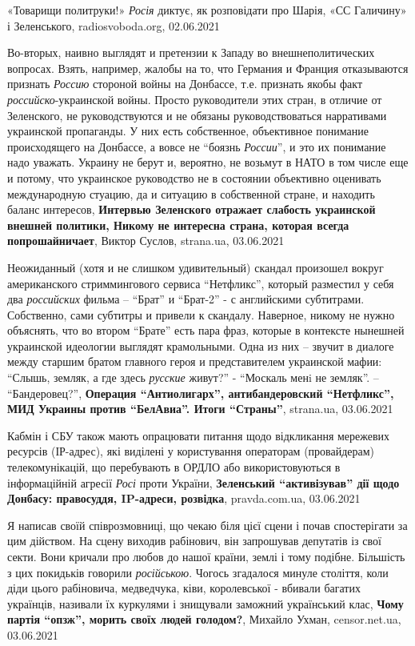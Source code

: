 «Товарищи политруки!» \emph{Росія} диктує, як розповідати про Шарія, «СС Галичину» і Зеленського,
radiosvoboda.org, 02.06.2021

Во-вторых, наивно выглядят и претензии к Западу во внешнеполитических вопросах.
Взять, например, жалобы на то, что Германия и Франция отказываются признать
\emph{Россию} стороной войны на Донбассе, т.е. признать якобы факт
\emph{российско}-украинской войны. Просто руководители этих стран, в отличие от
Зеленского, не руководствуются и не обязаны руководствоваться нарративами
украинской пропаганды. У них есть собственное, объективное понимание
происходящего на Донбассе, а вовсе не \enquote{боязнь \emph{России}}, и это их понимание надо
уважать. Украину не берут и, вероятно, не возьмут в НАТО в том числе еще и
потому, что украинское руководство не в состоянии объективно оценивать
международную стуацию, да и ситуацию в собственной стране, и находить баланс
интересов, 
\textbf{Интервью Зеленского отражает слабость украинской внешней политики,
Никому не интересна страна, которая всегда попрошайничает}, Виктор Суслов,
strana.ua, 03.06.2021

Неожиданный (хотя и не слишком удивительный) скандал произошел вокруг
американского стриммингового сервиса \enquote{Нетфликс}, который разместил у себя два
\emph{российских} фильма – \enquote{Брат} и \enquote{Брат-2} - с английскими субтитрами. Собственно,
сами субтитры и привели к скандалу. Наверное, никому не нужно объяснять, что
во втором \enquote{Брате} есть пара фраз, которые в контексте нынешней украинской
идеологии выглядят крамольными. Одна из них – звучит в диалоге между старшим
братом главного героя и представителем украинской мафии: \enquote{Слышь, земляк, а где
здесь \emph{русские} живут?} - \enquote{Москаль менi не земляк}. – \enquote{Бандеровец?},
\textbf{Операция \enquote{Антиолигарх}, антибандеровский \enquote{Нетфликс},
МИД Украины против \enquote{БелАвиа}. Итоги \enquote{Страны}}, strana.ua,
03.06.2021


Кабмін і СБУ також мають опрацювати питання щодо відкликання мережевих ресурсів
(ІР-адрес), які виділені у користування операторам (провайдерам)
телекомунікацій, що перебувають в ОРДЛО або використовуються в інформаційній
агресії \emph{Росі} проти України,
\textbf{Зеленський \enquote{активізував} дії щодо Донбасу: правосуддя, IP-адреси, розвідка},
pravda.com.ua, 03.06.2021

Я написав своїй співрозмовниці, що чекаю біля цієї сцени і почав спостерігати
за цим дійством.  На сцену виходив рабінович, він запрошував депутатів із свої
секти. Вони кричали про любов до нашої країни, землі і тому подібне. Більшість
з цих покидьків говорили \emph{російською}.  Чогось згадалося минуле століття, коли
діди цього рабіновича, медведчука, ківи, королевської - вбивали багатих
українців, називали їх куркулями і знищували заможний український клас,
\textbf{Чому партія \enquote{опзж}, морить своїх людей голодом?}, 
Михайло Ухман, censor.net.ua, 03.06.2021


